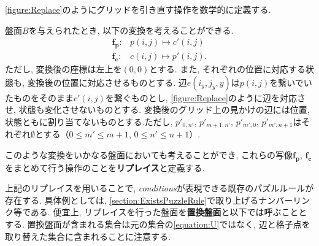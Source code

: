 \cref{figure:Replace}のようにグリッドを引き直す操作を数学的に定義する.
\begin{definition}[リプレイス]\label{definition:Replace}
  盤面$B$を与えられたとき, 以下の変換を考えることができる.
  \begin{align}
    \bm{f_p}\colon & p(i,j)  \longmapsto c'(i,j)  \\
    \bm{f_c}\colon & c(i,j)  \longmapsto p'(i,j).
  \end{align}
  ただし, 変換後の座標は左上を$(0,0)$とする.
  また, それぞれの位置に対応する状態も, 変換後の位置に対応させるものとする. 辺$e(i_y,j_y,y)$は$p(i,j)$を繋いでいたものをそのまま$c'(i,j)$を繋ぐものとし, \cref{figure:Replace}のように辺を対応させ, 状態も変化させないものとする. 変換後のグリッド上の見かけの辺には位置, 状態ともに割り当てないものとする.ただし, $p'_{0,n'}$, $p'_{m+1,n'}$, $p'_{m',0}$, $p'_{m',n+1}$はそれぞれ$\emptyset$とする$（0\le m' \le m+1$, $0\le n'\le n+1）$.

  このような変換をいかなる盤面においても考えることができ, これらの写像$\bm{f_p}$, $\bm{f_c}$をまとめて行う操作のことを\textbf{リプレイス}と定義する.
\end{definition}
上記のリプレイスを用いることで, \textit{conditions}が表現できる既存のパズルルールが存在する. 具体例としては, \cref{section:ExistsPuzzleRule}で取り上げるナンバーリンク等である. 便宜上, リプレイスを行った盤面を\textbf{置換盤面}と以下では呼ぶこととする. 置換盤面が含まれる集合は元の集合の\cref{equation:U}ではなく, 辺と格子点を取り替えた集合に含まれることに注意する.


